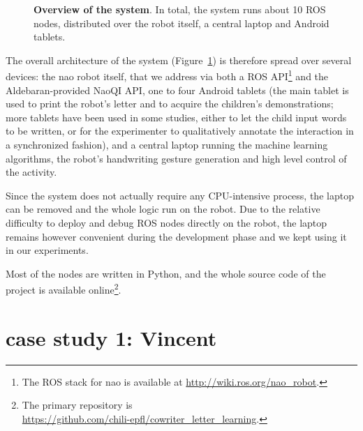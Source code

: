 \documentclass{sig-alternate}
\begin{document}
\begin{figure}[ht!]
{
}

\caption{\small \textbf{Overview of the system}. In total, the system runs about 10 ROS nodes,
    distributed over the robot itself, a central laptop and Android tablets.}

    \label{fig:archi}
\end{figure}

The overall architecture of the system (Figure~\ref{fig:archi}) is therefore
spread over several devices: the {\sc nao} robot itself, that we address via
both a ROS API\footnote{The ROS stack for {\sc nao} is available at 
\url{http://wiki.ros.org/nao_robot}.} and the Aldebaran-provided NaoQI API, one
to four Android tablets (the main tablet is used to print the robot's letter and
to acquire the children's demonstrations; more tablets have been used in some
studies, either to let the child input words to be written, or for the
experimenter to qualitatively annotate the interaction in a synchronized
fashion), and a central laptop running the machine learning algorithms, the
robot's handwriting gesture generation and high level control of the activity.

Since the system does not actually require any CPU-intensive process, the laptop
can be removed and the whole logic run on the robot. Due to the relative
difficulty to deploy and debug ROS nodes directly on the robot, the laptop
remains however convenient during the development phase and we kept using it in
our experiments.

Most of the nodes are written in Python, and the whole source code of the
project is available online\footnote{The primary repository is\\ 
\url{https://github.com/chili-epfl/cowriter_letter_learning}.}.


\section{case study 1: Vincent}\label{Vincent}
\end{document}
